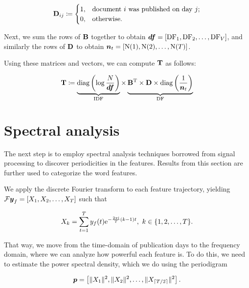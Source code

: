 \begin{equation}
	\mathbf{D}_{ij} \coloneqq
	\begin{cases}
		1, & \text{document}~i~\text{was published on day}~j \text{;} \\
		0, & \text{otherwise}.
	\end{cases}
\end{equation}

Next, we sum the rows of $\mathbf{B}$ together to obtain $\vect{\df} = \left[ \text{\df}_{1}, \text{\df}_{2}, \dots, \text{\df}_{\featcount} \right]$, and similarly the rows of $\mathbf{D}$ to obtain $\vect{\doccount}_{t} = \left[ \text{\doccount}(1), \text{\doccount}(2), \dots, \text{\doccount}(\streamlen) \right]$.

Using these matrices and vectors, we can compute $\mathbf{T}$ as follows:

\begin{equation}
	\trajmat \coloneqq
		\underbrace{\text{diag} \left( \log{\frac{\doccount}{\vect{\df}}} \right)}_{\text{IDF}}
		\times
		\underbrace{\bowmat^{\T}
		\times \dtdmat
		\times \text{diag} \left( \frac{1}{\vect{\doccount}_{t}} \right)}_{\text{DF}}
\end{equation}


\section{Spectral analysis}
The next step is to employ spectral analysis techniques borrowed from signal processing to discover periodicities in the features. Results from this section are further used to categorize the word features.

We apply the discrete Fourier transform to each feature trajectory, yielding $\mathcal{F} \vect{\traj}_{f} = \left[ X_{1}, X_{2}, \dots, X_{\streamlen}\right ]$ such that

\begin{equation*}
	X_{k} = \sum_{t = 1}^{T}{y_{f}(t) \mathrm{e}^{- \frac{2 \pi \mathrm{i}}{T} (k - 1) t}}, ~ k \in \{1, 2, \dots, T\}.
\end{equation*}

That way, we move from the time-domain of publication days to the frequency domain, where we can analyze how powerful each feature is. To do this, we need to estimate the power spectral density, which we do using the periodigram

\begin{equation*}
	\vect{P} = \left[ \|X_{1}\|^{2}, \|X_{2}\|^{2}, \dots, \|X_{\ceil{\streamlen / 2}}\|^{2} \right].
\end{equation*}

